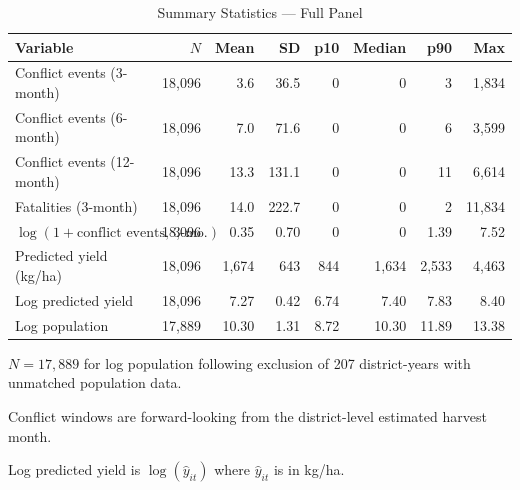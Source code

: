 \begin{table}[H]
\centering
\caption{Summary Statistics --- Full Panel}
\label{tab:sumstats}
\begin{threeparttable}
\begin{tabular}{lrrrrrrr}
\toprule
Variable & $N$ & Mean & SD & p10 & Median & p90 & Max \\
\midrule
Conflict events (3-month)             & 18,096 &  3.6  &  36.5 & 0    &  0    &  3    & 1,834 \\
Conflict events (6-month)             & 18,096 &  7.0  &  71.6 & 0    &  0    &  6    & 3,599 \\
Conflict events (12-month)            & 18,096 & 13.3  & 131.1 & 0    &  0    & 11    & 6,614 \\
Fatalities (3-month)                  & 18,096 & 14.0  & 222.7 & 0    &  0    &  2    &11,834 \\
$\log(1+\text{conflict events, 3-mo.})$ & 18,096 &  0.35 &  0.70 & 0    &  0    & 1.39  &  7.52 \\
Predicted yield (kg/ha)               & 18,096 & 1,674 &   643 & 844  & 1,634 & 2,533 & 4,463 \\
Log predicted yield                   & 18,096 &  7.27 &  0.42 & 6.74 &  7.40 &  7.83 &  8.40 \\
Log population                        & 17,889 & 10.30 &  1.31 & 8.72 & 10.30 & 11.89 & 13.38 \\
\bottomrule
\end{tabular}
\begin{tablenotes}
\footnotesize
\item $N = 17{,}889$ for log population following exclusion of 207 district-years with unmatched population data.
\item Conflict windows are forward-looking from the district-level estimated harvest month.
\item Log predicted yield is $\log(\hat{y}_{it})$ where $\hat{y}_{it}$ is in kg/ha.
\end{tablenotes}
\end{threeparttable}
\end{table}
